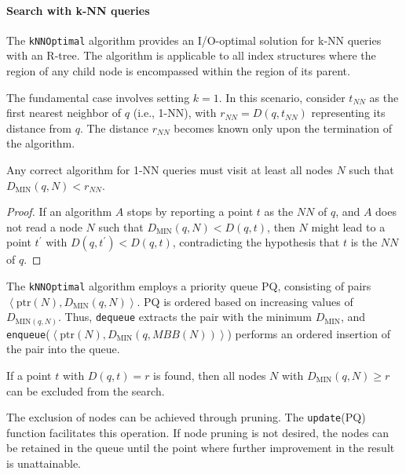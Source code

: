 \paragraph*{Search with k-NN queries}
The \texttt{kNNOptimal} algorithm provides an I/O-optimal solution for k-NN queries with an R-tree. 
The algorithm is applicable to all index structures where the region of any child node is encompassed within the region of its parent.

The fundamental case involves setting $k=1$. 
In this scenario, consider $t_{NN}$ as the first nearest neighbor of $q$ (i.e., 1-NN), with $r_{NN}=D(q,t_{NN})$ representing its distance from $q$. 
The distance $r_{NN}$ becomes known only upon the termination of the algorithm.
\begin{theorem}
    Any correct algorithm for 1-NN queries must visit at least all nodes $N$ such that $D_{\text{MIN}}(q,N) < r_{NN}$.
\end{theorem}
\begin{proof}
    If an algorithm $A$ stops by reporting a point $t$ as the $NN$ of $q$, and $A$ does not read a node $N$ such that $D_{\text{MIN}}(q,N) < D(q,t)$, then $N$ might lead to a point $t^{'}$ with $D(q,t^{'}) < D(q,t)$, contradicting the hypothesis that $t$ is the $NN$ of $q$.
\end{proof}

The \texttt{kNNOptimal} algorithm employs a priority queue PQ, consisting of pairs $\left\langle \text{ptr}(N), D_{\text{MIN}}(q,N)\right\rangle $. 
PQ is ordered based on increasing values of $D_{\text{MIN}(q,N)}$. 
Thus, \texttt{dequeue} extracts the pair with the minimum $D_{\text{MIN}}$, and \texttt{enqueue}($\left\langle \text{ptr}(N), D_{\text{MIN}}(q,MBB(N)) \right\rangle $) performs an ordered insertion of the pair into the queue.
\begin{property}
    If a point $t$ with $D(q,t) = r$ is found, then all nodes $N$ with $D_{\text{MIN}}(q,N) \geq r$ can be excluded from the search.
\end{property}
The exclusion of nodes can be achieved through pruning. 
The \texttt{update}(PQ) function facilitates this operation. 
If node pruning is not desired, the nodes can be retained in the queue until the point where further improvement in the result is unattainable.


